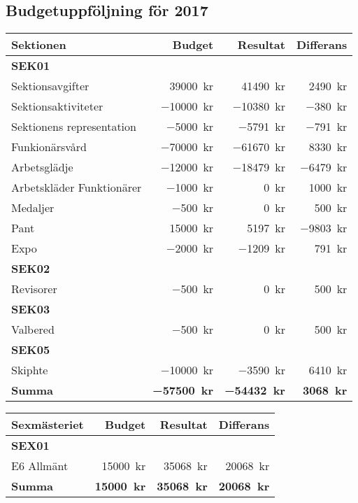 \documentclass[../_main/handlingar.tex]{subfiles}
\begin{document}
\subsection{Budgetuppföljning för 2017}

\begin{tabularx}{12cm}{X r r r}
    \textbf{\large Sektionen} & \textbf{Budget} & \textbf{Resultat} & \textbf{Differans} \\
    \hline
    \textbf{SEK01} \\
    Sektionsavgifter & \SI{39000}{kr} & \SI{41490}{kr} & \SI{2490}{kr} \\
    Sektionsaktiviteter & \SI{-10000}{kr} & \SI{-10380}{kr} & \SI{-380}{kr} \\
    Sektionens representation & \SI{-5000}{kr} & \SI{-5791}{kr} & \SI{-791}{kr} \\
    Funkionärsvård & \SI{-70000}{kr} & \SI{-61670}{kr} & \SI{8330}{kr} \\
    Arbetsglädje & \SI{-12000}{kr} & \SI{-18479}{kr} & \SI{-6479}{kr} \\
    Arbetskläder Funktionärer & \SI{-1000}{kr} & \SI{0}{kr} & \SI{1000}{kr} \\
    Medaljer & \SI{-500}{kr} & \SI{0}{kr} & \SI{500}{kr} \\
    Pant & \SI{15000}{kr} & \SI{5197}{kr} & \SI{-9803}{kr} \\
    Expo & \SI{-2000}{kr} & \SI{-1209}{kr} & \SI{791}{kr} \\
    \textbf{SEK02} \\
    Revisorer & \SI{-500}{kr} & \SI{0}{kr} & \SI{500}{kr} \\
    \textbf{SEK03} \\
    Valbered & \SI{-500}{kr} & \SI{0}{kr} & \SI{500}{kr} \\
    \textbf{SEK05} \\
    Skiphte & \SI{-10000}{kr} & \SI{-3590}{kr} & \SI{6410}{kr} \\
    \hline
    \textbf{Summa} & \textbf{\SI{-57500}{kr}} & \textbf{\SI{-54432}{kr}} & \textbf{\SI{3068}{kr}} \\
\end{tabularx}

\begin{tabularx}{12cm}{X r r r}
    \textbf{\large Sexmästeriet} & \textbf{Budget} & \textbf{Resultat} & \textbf{Differans} \\
    \hline
    \textbf{SEX01} \\
    E6 Allmänt & \SI{15000}{kr} & \SI{35068}{kr} & \SI{20068}{kr} \\
    \hline
    \textbf{Summa} & \textbf{\SI{15000}{kr}} & \textbf{\SI{35068}{kr}} & \textbf{\SI{20068}{kr}} \\
\end{tabularx}
\end{document}
